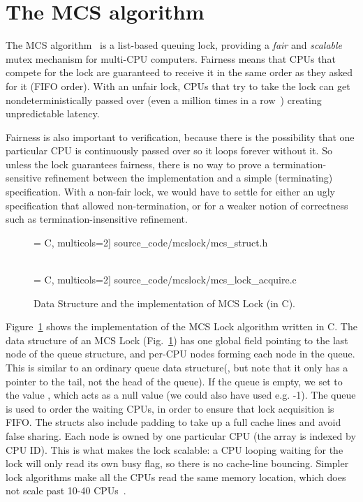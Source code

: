 \section{The MCS algorithm}
\label{sec:overview}

The MCS algorithm~\cite{mcs91} is a list-based queuing lock,
providing a \emph{fair} and \emph{scalable} mutex mechanism for
multi-CPU computers. Fairness means that
CPUs that compete for the lock are guaranteed to receive it in the same
order as they asked for it (FIFO order). With an unfair lock, CPUs
that try to take the lock can get nondeterministically passed over
(even a million times in a row~\cite{lwn:ticketlocks}) creating
unpredictable latency.

Fairness is also important to verification, because
there is the possibility that one particular CPU is continuously
passed over so it loops forever without it.
So unless the lock
guarantees fairness, there is no way to prove a termination-sensitive
refinement between the implementation and a simple (terminating)
specification. With a non-fair lock, we would have to settle for
either an ugly specification that allowed non-termination, or for a
weaker notion of correctness such as termination-insensitive
refinement.

\begin{figure}
\begin{minipage}{\linewidth}
 = C, multicols=2] {source_code/mcslock/mcs_struct.h}
\end{minipage}
\\

 = C, multicols=2] {source_code/mcslock/mcs_lock_acquire.c}
\caption{Data Structure and the implementation of MCS Lock (in C).}
\label{fig:chapter:mcs-lock:mcs_lock}
\end{figure}

Figure~\ref{fig:chapter:mcs-lock:mcs_lock} shows the implementation of the MCS Lock algorithm written in C. 
The data structure of an MCS Lock (Fig.~\ref{fig:chapter:mcs-lock:mcs_lock}) has
one global field pointing to the last node of the queue structure, and
per-CPU nodes forming each node in the queue. This is similar to an
ordinary queue data structure(, but note that it only has a
pointer to the tail, not the head of the queue).  If the queue is
empty, we set  to the value , which
acts as a null value (we could also have used e.g. -1). The queue is
used to order the waiting CPUs, in order to ensure that lock
acquisition is FIFO. The structs also include padding to take up a
full cache lines and avoid false sharing.  Each node is owned by one
particular CPU (the array is indexed by CPU ID).  This is what makes
the lock scalable: a CPU looping waiting for the lock will only read
its own busy flag, so there is no cache-line bouncing. Simpler lock
algorithms make all the CPUs read the same memory location, which does
not scale past 10-40 CPUs~\cite{Boyd-wickizer12}.

